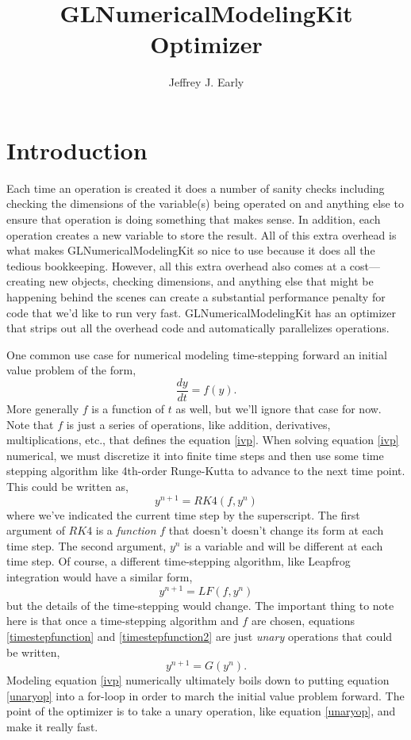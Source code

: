 \documentclass[11pt]{article}
\title{GLNumericalModelingKit Optimizer}
\author{Jeffrey J. Early}
\begin{document}
\maketitle

\section{Introduction}

Each time an operation is created it does a number of sanity checks including checking the dimensions of the variable(s) being operated on and anything else to ensure that operation is doing something that makes sense. In addition, each operation creates a new variable to store the result. All of this extra overhead is what makes GLNumericalModelingKit so nice to use because it does all the tedious bookkeeping. However, all this extra overhead also comes at a cost---creating new objects, checking dimensions, and anything else that might be happening behind the scenes can create a substantial performance penalty for code that we'd like to run very fast. GLNumericalModelingKit has an optimizer that strips out all the overhead code and automatically parallelizes operations.

One common use case for numerical modeling time-stepping forward an initial value problem of the form,
\begin{equation}
\label{ivp}
\frac{dy}{dt} = f(y).
\end{equation}
More generally $f$ is a function of $t$ as well, but we'll ignore that case for now. Note that $f$ is just a series of operations, like addition, derivatives, multiplications, etc., that defines the equation \ref{ivp}. When solving equation \ref{ivp} numerical, we must discretize it into finite time steps and then use some time stepping algorithm like 4th-order Runge-Kutta to advance to the next time point. This could be written as,
\begin{equation}
\label{timestepfunction}
y^{n+1} = RK4( f, y^n )
\end{equation}
where we've indicated the current time step by the superscript. The first argument of $RK4$ is a \emph{function} $f$ that doesn't doesn't change its form at each time step. The second argument, $y^n$ is a variable and will be different at each time step. Of course, a different time-stepping algorithm, like Leapfrog integration would have a similar form,
\begin{equation}
\label{timestepfunction2}
y^{n+1} = LF( f, y^n )
\end{equation}
but the details of the time-stepping would change. The important thing to note here is that once a time-stepping algorithm and $f$ are chosen, equations \ref{timestepfunction} and \ref{timestepfunction2} are just \emph{unary} operations that could be written,
\begin{equation}
\label{unaryop}
y^{n+1} = G( y^n ).
\end{equation}
Modeling equation \ref{ivp} numerically ultimately boils down to putting equation \ref{unaryop} into a for-loop in order to march the initial value problem forward. The point of the optimizer is to take a unary operation, like equation \ref{unaryop}, and make it really fast.
\end{document}
